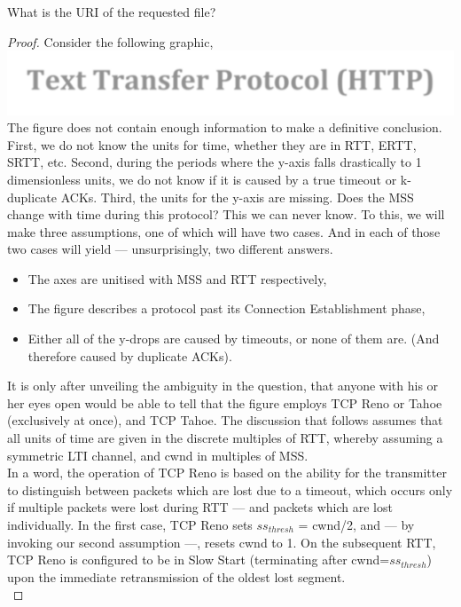 \documentclass[../../main.tex]{subfiles}
\begin{document}
\begin{wts}
What is the URI of the requested file?
\end{wts}
\begin{proof}
Consider the following graphic,\\
\includegraphics[width=\textwidth]{subfiles/images/L5_Manual/L5N2_ DNS & HTTP_PAGE20_11_Image131.png}
The figure does not contain enough information to make a definitive conclusion. First, we do not know the units for time, whether they are in RTT, ERTT, SRTT, etc. Second, during the periods where the y-axis falls drastically to 1 dimensionless units, we do not know if it is caused by a true timeout or k-duplicate ACKs. Third, the units for the y-axis are missing. Does the MSS change with time during this protocol? This we can never know. To this, we will make three assumptions, one of which will have two cases. And in each of those two cases will yield — unsurprisingly, two different answers.
\begin{itemize}
    \item The axes are unitised with MSS and RTT respectively,
    \item The figure describes a protocol past its Connection Establishment phase,
    \item Either all of the y-drops are caused by timeouts, or none of them are. (And therefore caused by duplicate ACKs).
\end{itemize}

It is only after unveiling the ambiguity in the question, that anyone with his or her eyes open would be able to tell that the figure employs TCP Reno or Tahoe (exclusively at once), and TCP Tahoe. The discussion that follows assumes that all units of time are given in the discrete multiples of RTT, whereby assuming a symmetric LTI channel, and cwnd in multiples of MSS.\\

In a word, the operation of TCP Reno is based on the ability for the transmitter to distinguish between packets which are lost due to a timeout, which occurs only if multiple packets were lost during RTT — and packets which are lost individually. In the first case, TCP Reno sets ${ss}_{thresh}$ = cwnd/2, and — by invoking our second assumption —, resets cwnd to 1. On the subsequent RTT, TCP Reno is configured to be in Slow Start (terminating after cwnd=${ss}_{thresh}$) upon the immediate retransmission of the oldest lost segment.\\


\end{proof}
\end{document}
